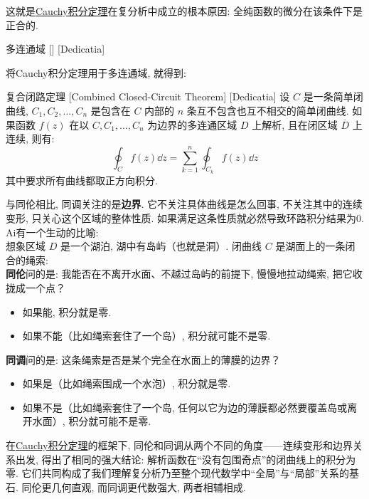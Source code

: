 \documentclass[UTF8]{ctexart}
\newcommand{\CauchyThm}{\hyperref[thm:Cauchy]{Cauchy积分定理}}
\begin{document}
这就是\CauchyThm 在复分析中成立的根本原因: 全纯函数的微分在该条件下是正合的. 
\begin{dfn}
    [UUID]
    {多连通域}
    []
    [Dedicatia]
\end{dfn}
将Cauchy积分定理用于多连通域, 就得到: 
\begin{thm}
    [CombinedClosedCircuit]
    {复合闭路定理}
    [Combined Closed-Circuit Theorem]
    [Dedicatia]
    设  \( C \)  是一条简单闭曲线,  \( C_1, C_2, \ldots, C_n \)  是包含在  \( C \)  内部的  \( n \)  条互不包含也互不相交的简单闭曲线. 如果函数  \( f(z) \)  在以  \( C, C_1, \ldots, C_n \)  为边界的多连通区域 \( D \) 上解析, 且在闭区域  \( \overline{D} \)  上连续, 则有: 
    \[\oint_C f(z) \dd z = \sum_{k=1}^n \oint_{C_k} f(z) \dd z\]
    其中要求所有曲线都取正方向积分. 
\end{thm}
与同伦相比, 同调关注的是\textbf{边界}. 它不关注具体曲线是怎么回事, 不关注其中的连续变形, 只关心这个区域的整体性质. 如果满足这条性质就必然导致环路积分结果为0.\\
Ai有一个生动的比喻:\\
想象区域  \( D \)  是一个湖泊, 湖中有岛屿（也就是洞）. 闭曲线  \( C \)  是湖面上的一条闭合的绳索:\\
\textbf{同伦}问的是: 我能否在不离开水面、不越过岛屿的前提下, 慢慢地拉动绳索, 把它收拢成一个点？
\begin{itemize}
    \item 如果能, 积分就是零. 
    \item 如果不能（比如绳索套住了一个岛）, 积分就可能不是零. 
\end{itemize}
\textbf{同调}问的是: 这条绳索是否是某个完全在水面上的薄膜的边界？
\begin{itemize}
    \item 如果是（比如绳索围成一个水泡）, 积分就是零. 
    \item 如果不是（比如绳索套住了一个岛, 任何以它为边的薄膜都必然要覆盖岛或离开水面）, 积分就可能不是零. 
\end{itemize}
在\CauchyThm 的框架下, 同伦和同调从两个不同的角度——连续变形和边界关系出发, 得出了相同的强大结论: 解析函数在“没有包围奇点”的闭曲线上的积分为零. 它们共同构成了我们理解复分析乃至整个现代数学中“全局”与“局部”关系的基石. 同伦更几何直观, 而同调更代数强大, 两者相辅相成. 
\end{document}
